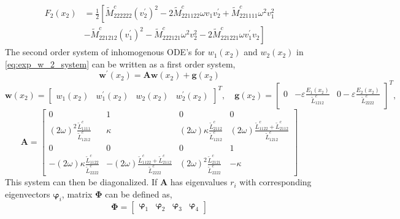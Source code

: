 \documentclass[11pt]{report}
\begin{document}
\begin{appendices}
\begin{equation}
\begin{aligned}
F_2(x_2) &= \frac{1}{2} \left[ \tilde{M}^c_{222222} (v_2^\prime)^2 - 2 \tilde{M}^c_{221122} \omega v_1 v_2^\prime + \tilde{M}^c_{221111} \omega^2 v_1^2 \right. \\
&- \left. \tilde{M}^c_{221212} (v_1^\prime)^2 - \tilde{M}^c_{222121} \omega^2 v_2^2 - 2 \tilde{M}^c_{221221} \omega v_1^\prime v_2 \right]
\end{aligned}
\end{equation}
The second order system of inhomogenous ODE's for $w_1(x_2)$ and $w_2(x_2)$ in \eqref{eq:exp_w_2_system} can be written as a first order system,
\begin{equation} \label{eq:exp_w_1_ode}
\mathbf{w}^\prime(x_2) = \mathbf{A} \mathbf{w}(x_2) + \mathbf{g}(x_2)
\end{equation}
\begin{equation*}
\mathbf{w}(x_2) = \begin{bmatrix} w_1(x_2) & w_1^\prime(x_2) & w_2(x_2) & w_2^\prime(x_2) \end{bmatrix}^T, \quad \mathbf{g}(x_2) = \begin{bmatrix}
0 & -\varepsilon \frac{E_1(x_2)}{\tilde{L}^c_{1212}} & 0 -\varepsilon \frac{E_2(x_2)}{\tilde{L}^c_{2222}}
\end{bmatrix}^T, 
\end{equation*}
\begin{equation*}
\mathbf{A} = \begin{bmatrix}
0 & 1 & 0 & 0 \\
(2 \omega)^2 \frac{\tilde{L}^c_{1111}}{\tilde{L}^c_{1212}} & \kappa & (2 \omega) \kappa \frac{\tilde{L}^c_{2112}}{\tilde{L}^c_{1212}} &
(2 \omega) \frac{\tilde{L}^c_{1122} + \tilde{L}^c_{2112}}{\tilde{L}^c_{1212}} \\
0 & 0 & 0 & 1 \\
-(2 \omega) \kappa \frac{\tilde{L}^c_{1122}}{\tilde{L}^c_{2222}} &
-(2 \omega) \frac{\tilde{L}^c_{1122} + \tilde{L}^c_{2112}}{\tilde{L}^c_{2222}} & (2 \omega)^2 \frac{\tilde{L}^c_{2121}}{\tilde{L}^c_{2222}} & -\kappa
\end{bmatrix}
\end{equation*}
This system can then be diagonalized. If $\mathbf{A}$ has eigenvalues $r_i$ with corresponding eigenvectors $\bm{\varphi}_i$, matrix $\mathbf{\Phi}$ can be defined as,
\begin{equation}
\mathbf{\Phi} = \begin{bmatrix}
\bm{\varphi}_1 & \bm{\varphi}_2 & \bm{\varphi}_3 & \bm{\varphi}_4
\end{bmatrix}
\end{equation}

\end{appendices}
\end{document}
